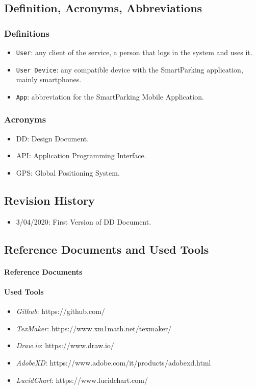 \documentclass[11pt]{article} %
\begin{document}
\subsection{Definition, Acronyms, Abbreviations}

\subsubsection{Definitions}
\begin{itemize}
\item \texttt{User}: any client of the service, a person that logs in the system and uses it.
\item \texttt{User Device}: any compatible device with the SmartParking application, mainly smartphones.
\item \texttt{App}: abbreviation for the SmartParking Mobile Application.
\end{itemize}

\subsubsection{Acronyms}
\begin{itemize}
\item DD: Design Document.
\item API: Application Programming Interface.
\item GPS: Global Positioning System.
\end{itemize}


\subsection{Revision History}
\begin{itemize}
\item 3/04/2020: First Version of DD Document.
\end{itemize}

\subsection{Reference Documents and Used Tools}
\paragraph{Reference Documents}


\paragraph{Used Tools}
\begin{itemize}
\item \textit{Github}: https://github.com/
\item \textit{TexMaker}: https://www.xm1math.net/texmaker/
\item \textit{Draw.io}: https://www.draw.io/
\item \textit{AdobeXD}: https://www.adobe.com/it/products/adobexd.html
\item \textit{LucidChart}: https://www.lucidchart.com/
\end{itemize}
\end{document}
